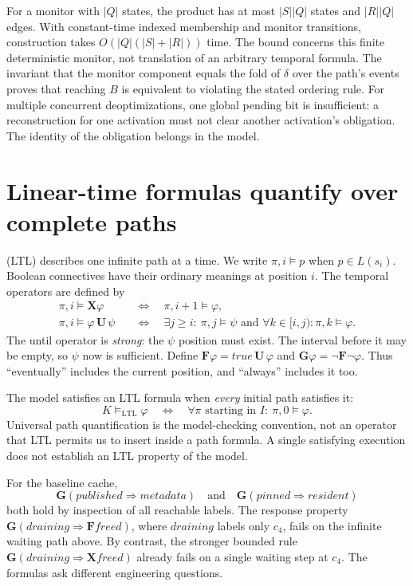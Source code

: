 For a monitor with $|Q|$ states, the product has at most $|S||Q|$ states and $|R||Q|$ edges.
With constant-time indexed membership and monitor transitions, construction takes $O(|Q|(|S|+|R|))$ time.
The bound concerns this finite deterministic monitor, not translation of an arbitrary temporal formula.
The invariant that the monitor component equals the fold of $\delta$ over the path's events proves that reaching $B$ is equivalent to violating the stated ordering rule.
For multiple concurrent deoptimizations, one global pending bit is insufficient: a reconstruction for one activation must not clear another activation's obligation.
The identity of the obligation belongs in the model.

\section{Linear-time formulas quantify over complete paths}
\label{sec:ch45-ltl}

 (LTL) describes one infinite path at a time.
We write $\pi,i\models p$ when $p\in L(s_i)$.
Boolean connectives have their ordinary meanings at position $i$.
The temporal operators are defined by
\begin{align*}
 \pi,i\models\mathbf{X}\varphi
 &\quad\Longleftrightarrow\quad \pi,i+1\models\varphi,\\
 \pi,i\models\varphi\,\mathbf{U}\,\psi
 &\quad\Longleftrightarrow\quad
 \exists j\geq i:\ \pi,j\models\psi
 \text{ and }\forall k\in[i,j):\pi,k\models\varphi.
\end{align*}
The until operator is \emph{strong}: the $\psi$ position must exist.
The interval before it may be empty, so $\psi$ now is sufficient.
Define $\mathbf{F}\varphi=\mathit{true}\,\mathbf{U}\,\varphi$ and $\mathbf{G}\varphi=\neg\mathbf{F}\neg\varphi$.
Thus \enquote{eventually} includes the current position, and \enquote{always} includes it too.

The model satisfies an LTL formula when \emph{every} initial path satisfies it:
\[
 K\models_{\mathrm{LTL}}\varphi
 \quad\Longleftrightarrow\quad
 \forall\pi\text{ starting in }I:\ \pi,0\models\varphi.
\]
Universal path quantification is the model-checking convention, not an operator that LTL permits us to insert inside a path formula.
A single satisfying execution does not establish an LTL property of the model.

For the baseline cache,
\[
 \mathbf{G}(\mathit{published}\Rightarrow\mathit{metadata})
 \quad\text{and}\quad
 \mathbf{G}(\mathit{pinned}\Rightarrow\mathit{resident})
\]
both hold by inspection of all reachable labels.
The response property $\mathbf{G}(\mathit{draining}\Rightarrow\mathbf{F}\mathit{freed})$, where $\mathit{draining}$ labels only $c_4$, fails on the infinite waiting path above.
By contrast, the stronger bounded rule $\mathbf{G}(\mathit{draining}\Rightarrow\mathbf{X}\mathit{freed})$ already fails on a single waiting step at $c_4$.
The formulas ask different engineering questions.

